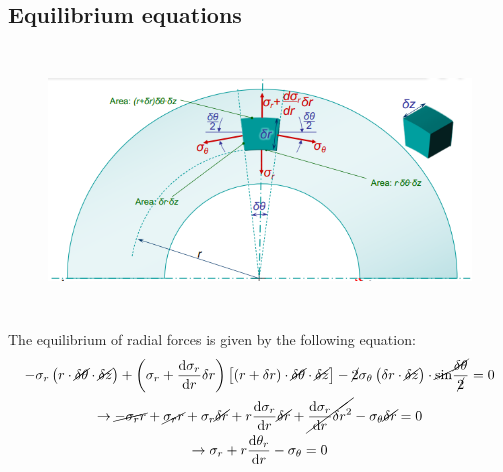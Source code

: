 \documentclass[class=report, crop=false, 12pt,a4paper]{standalone}
\begin{document}
\subsection{Equilibrium equations}
\begin{figure}[H]
    \centering
    \includegraphics[height = 7cm]{../img/diagram109.png}
    \caption{}
\end{figure}
The equilibrium of radial forces is given by the following equation:
\begin{gather}
    -\sigma_r \left(r\cdot \cancel{\delta \theta} \cdot \cancel{\delta z}\right) + \left(\sigma_r + \frac{\dif \sigma_r}{\dif r}\delta r \right) \left[ \left(r + \delta r \right) \cdot \cancel{\delta \theta} \cdot \cancel{\delta z}\right] - \cancel{2} \sigma_{\theta} \left(\delta r \cdot \cancel{\delta z}\right) \cdot \cancel{\sin} \frac{\cancel{\delta \theta}}{\cancel{2}} = 0\\
    \rightarrow \cancel{-\sigma_r r} + \cancel{\sigma_r r} + \sigma_r \cancel{\delta r} + r \frac{\dif \sigma_r}{\dif r} \cancel{\delta r} + \cancel{\frac{\dif \sigma_r}{\dif r}\delta r^2} - \sigma_{\theta} \cancel{\delta r} = 0\\
    \rightarrow \sigma_r + r\frac{\dif \theta_r}{\dif r} - \sigma_{\theta} = 0
\end{gather}
\end{document}
